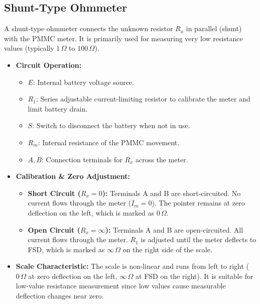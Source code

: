 \documentclass[12pt,a4paper]{article}
\begin{document}
\subsection{Shunt-Type Ohmmeter}
A shunt-type ohmmeter connects the unknown resistor $R_x$ in parallel (shunt) with the PMMC meter. It is primarily used for measuring very low resistance values (typically $1\,\Omega$ to $100\,\Omega$).

\begin{itemize}[leftmargin=*, itemsep=3.5pt]
  \item \textbf{Circuit Operation:}
    \begin{itemize}[leftmargin=*, itemsep=2.5pt, topsep=0pt]
      \item $E$: Internal battery voltage source.
      \item $R_1$: Series adjustable current-limiting resistor to calibrate the meter and limit battery drain.
      \item $S$: Switch to disconnect the battery when not in use.
      \item $R_m$: Internal resistance of the PMMC movement.
      \item $A, B$: Connection terminals for $R_x$ across the meter.
    \end{itemize}
  \item \textbf{Calibration \& Zero Adjustment:}
    \begin{itemize}[leftmargin=*, itemsep=2.5pt, topsep=0pt]
      \item \textbf{Short Circuit ($R_x = 0$):} Terminals A and B are short-circuited. No current flows through the meter ($I_m = 0$). The pointer remains at zero deflection on the left, which is marked as $0\,\Omega$.
      \item \textbf{Open Circuit ($R_x = \infty$):} Terminals A and B are open-circuited. All current flows through the meter. $R_1$ is adjusted until the meter deflects to FSD, which is marked as $\infty\,\Omega$ on the right side of the scale.
    \end{itemize}
  \item \textbf{Scale Characteristic:} The scale is non-linear and runs from left to right ($0\,\Omega$ at zero deflection on the left, $\infty\,\Omega$ at FSD on the right). It is suitable for low-value resistance measurement since low values cause measurable deflection changes near zero.
\end{itemize}
\end{document}
